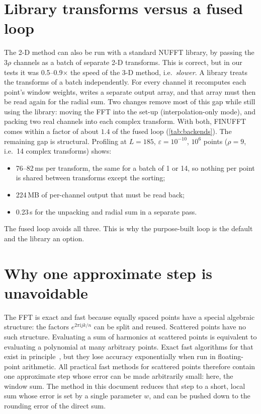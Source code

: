 \documentclass[11pt,a4paper]{article}
\theoremstyle{definition}
\newcommand{\eps}{\varepsilon}
\newcommand{\ii}{\mathrm{i}}
\begin{document}
\section{Library transforms versus a fused loop}\label{app:fused}
The 2-D method can also be run with a standard NUFFT library, by passing the $3\rho$ channels as a batch of separate 2-D transforms. This is correct,
but in our tests it was 0.5--0.9$\times$ the speed of the 3-D method, i.e.\ \emph{slower}. A library treats the transforms of a batch independently.
For every channel it recomputes each point's window weights, writes a separate output array, and that array must then be read again for the radial sum.
Two changes remove most of this gap while still using the library: moving the FFT into the set-up (interpolation-only mode), and packing two real
channels into each complex transform. With both, FINUFFT comes within a factor of about $1.4$ of the fused loop (\cref{tab:backends}). The remaining
gap is structural. Profiling at $L=185$, $\eps=10^{-10}$, $10^6$ points ($\rho=9$, i.e.\ 14 complex transforms) shows:
\begin{itemize}
\item 76--82\,ms per transform, the same for a batch of 1 or 14, so nothing per point is shared between transforms except the sorting;
\item 224\,MB of per-channel output that must be read back;
\item 0.23\,s for the unpacking and radial sum in a separate pass.
\end{itemize}
The fused loop avoids all three. This is why the purpose-built loop is the default and the library an option.

\section{Why one approximate step is unavoidable}\label{app:exact}
The FFT is exact and fast because equally spaced points have a special algebraic structure: the factors $e^{2\pi\ii jk/n}$ can be split and reused.
Scattered points have no such structure. Evaluating a sum of harmonics at scattered points is equivalent to evaluating a polynomial at many arbitrary
points. Exact fast algorithms for that exist in principle~\cite{borodin1974}, but they lose accuracy exponentially when run in floating-point arithmetic.
All practical fast methods for scattered points therefore contain one approximate step whose error can be made arbitrarily small: here, the window
sum. The method in this document reduces that step to a short, local sum whose error is set by a single parameter $w$, and can be pushed down to the
rounding error of the direct sum.
\end{document}
